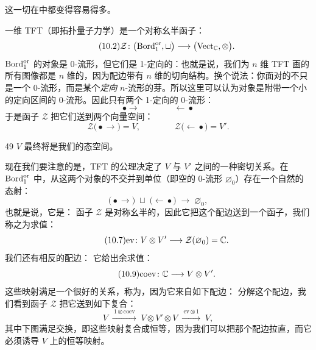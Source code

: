 这一切在中都变得容易得多。

一维 TFT（即拓扑量子力学）是一个对称幺半函子：
\begin{equation}\tag{10.2}
\mathcal{Z}\colon \big(\mathrm{Bord}_1^{\mathrm{or}},\sqcup\big)\longrightarrow\big(\mathrm{Vect}_{\mathbb{C}},\otimes\big).
\end{equation}
$\mathrm{Bord}_1^{\mathrm{or}}$ 的对象是 $0$-流形，但它们是 1-定向的：也就是说，我们为 $n$ 维 TFT 画的所有图像都是 $n$ 维的，因为配边带有 $n$ 维的切向结构。换个说法：你面对的不只是一个 $0$-流形，而是某个\emph{定向} $n$-流形的芽。所以这里可以认为对象是附带一个小的定向区间的 $0$-流形。因此只有两个 1-定向的 $0$-流形：
\begin{equation}\tag{10.3}
\bullet\!\!\longrightarrow \qquad\qquad \longleftarrow\!\!\bullet
\end{equation}
于是函子 $\mathcal{Z}$ 把它们送到两个向量空间：
\begin{equation}\tag{10.4}
\mathcal{Z}\big(\bullet\!\!\longrightarrow\big)=V, \qquad\qquad
\mathcal{Z}\big(\longleftarrow\!\!\bullet\big)=V'.
\end{equation}

\begin{srcrem}{49}
$V$ 最终将是我们的态空间。
\end{srcrem}

现在我们要注意的是，TFT 的公理决定了 $V$ 与 $V'$ 之间的一种密切关系。在 $\mathrm{Bord}_1^{\mathrm{or}}$ 中，从这两个对象的不交并到单位（即空的 $0$-流形 $\varnothing_0$）存在一个自然的态射：
\begin{equation}\tag{10.5}
\big(\bullet\!\!\longrightarrow\big)\;\sqcup\;\big(\longleftarrow\!\!\bullet\big)\;\longrightarrow\;\varnothing_0,
\end{equation}
也就是说，它是：
函子 $\mathcal{Z}$ 是对称幺半的，因此它把这个配边送到一个函子，我们称之为求值：
\begin{equation}\tag{10.7}
\mathrm{ev}\colon V\otimes V'\longrightarrow \mathcal{Z}(\varnothing_0)=\mathbb{C}.
\end{equation}
我们还有相反的配边：
它给出余求值：
\begin{equation}\tag{10.9}
\mathrm{coev}\colon \mathbb{C}\longrightarrow V\otimes V'.
\end{equation}
这些映射满足一个很好的关系，称为，因为它来自如下配边：
分解这个配边，我们看到函子 $\mathcal{Z}$ 把它送到如下复合：
\begin{equation}\tag{10.11}
V\;\xrightarrow{\ 1\otimes\mathrm{coev}\ }\;V\otimes V'\otimes V\;\xrightarrow{\ \mathrm{ev}\otimes 1\ }\;V,
\end{equation}
其中下图满足交换，即这些映射复合成恒等，因为我们可以把那个配边拉直，而它必须诱导 $V$ 上的恒等映射。

